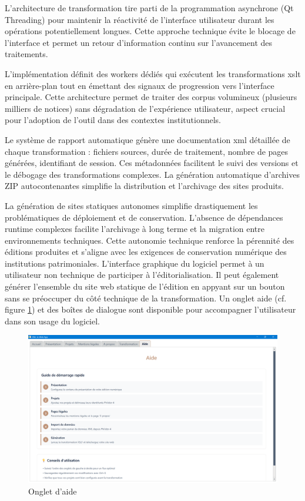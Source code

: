 L'architecture de transformation tire parti de la programmation asynchrone (Qt Threading) pour maintenir la réactivité de l'interface utilisateur durant les opérations potentiellement longues. Cette approche technique évite le blocage de l'interface et permet un retour d'information continu sur l'avancement des traitements.

L'implémentation définit des workers dédiés  qui exécutent les transformations \gls{xslt} en arrière-plan tout en émettant des signaux de progression vers l'interface principale. Cette architecture permet de traiter des corpus volumineux (plusieurs milliers de notices) sans dégradation de l'expérience utilisateur, aspect crucial pour l'adoption de l'outil dans des contextes institutionnels.

Le système de rapport automatique génère une documentation \gls{xml} détaillée de chaque transformation : fichiers sources, durée de traitement, nombre de pages générées, identifiant de session. Ces métadonnées facilitent le suivi des versions et le débogage des transformations complexes. La génération automatique d'archives ZIP autocontenantes simplifie la distribution et l'archivage des sites produits.

La génération de sites statiques autonomes simplifie drastiquement les problématiques de déploiement et de conservation. L'absence de dépendances runtime complexes facilite l'archivage à long terme et la migration entre environnements techniques. Cette autonomie technique renforce la pérennité des éditions produites et s'aligne avec les exigences de conservation numérique des institutions patrimoniales. L'interface graphique du logiciel permet à un utilisateur non technique de participer à l'éditorialisation. Il peut également générer l'ensemble du site web statique de l'édition en appyant sur un bouton sans se préoccuper du côté technique de la transformation. Un onglet aide (cf. figure \ref{appli-onglet-aide}) et des boîtes de dialogue sont disponible pour accompagner l'utilisateur dans son usage du logiciel.

\begin{figure}[h]
	\caption{Onglet d'aide} \label{appli-onglet-aide}
	\centering
	\includegraphics[width=\textwidth]{images/appli-onglet-aide.png}
\end{figure}

